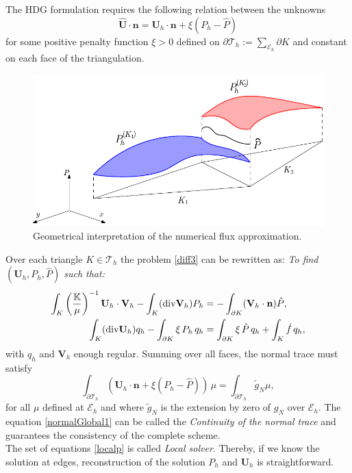 \documentclass[review]{elsarticle}
\def\dd{{\rm div}}
\def\trian{\mathcal{T}_h}
\def\nn{\textbf{n}}
\def\unn{\textbf{U}}
\def\vnn{\textbf{V}}
\def\esq{\mathcal{E}}
\begin{document}
The HDG formulation requires the following relation between the unknowns \cite{cockburn2010projection}
\begin{equation}\label{ContinuidadTrazaNormal}
\hat{\unn}\cdot\nn= \unn_h\cdot\nn + \xi (P_h-\hat{P})
\end{equation} 
for some positive penalty function $\xi>0$ defined on $\partial \trian := \sum_{\esq_h} \partial K$ and constant on each face of the triangulation. 
\begin{figure}[H]
	\centering
	\includegraphics[width=0.8\linewidth]{./Figures/Methodology/P_gorro}
	\caption{Geometrical interpretation of the numerical flux approximation.}
	\label{fig:P_gorro}
\end{figure}
Over each triangle $K \in \mathcal{T}_h$ the problem \eqref{diff3} can be rewritten as: \textit{To find $(\unn_h,P_h,\hat{P})$ such that:}
\begin{equation}\label{localp}
\begin{aligned} 
\int_K \left( \frac{\mathbb{K}}{\mu} \right) ^{-1} \unn_h \cdot \vnn_h  - \int_K   (\dd\vnn_h)P_h  &= - \int_{\partial K}(\vnn_h\cdot\nn)\hat{P} ,\\
\int_K   (\dd \unn_h)q_h - \int_{\partial K}\xi\, P_h\,q_h &= 
\int_{\partial K} \xi\,\hat{P}\,q_h + \int_K \dot{f}\,q_h,		
\end{aligned}
\end{equation}
with $q_h$ and $\vnn_h$ enough regular. Summing over all faces, the normal trace must satisfy
\begin{equation} \label{normalGlobal1}
\int_{\partial \trian} \left( \unn_h\cdot\nn + \xi (P_h-\hat{P})\right) \, \mu = \int_{\partial \trian} \tilde{g}_N\mu,
\end{equation}
for all $\mu$ defined at $\esq_h$ and where $\tilde{g}_N$ is the extension by zero of $g_N$ over $\esq_h$. The equation \eqref{normalGlobal1} can be called the \textit{Continuity of the normal trace} and guarantees the consistency of the complete scheme. \\
The set of equations \eqref{localp} is called \textit{Local solver}. Thereby, if we know the solution at edges, reconstruction of the solution $P_h$ and $\unn_h$ is straightforward.
\end{document}
